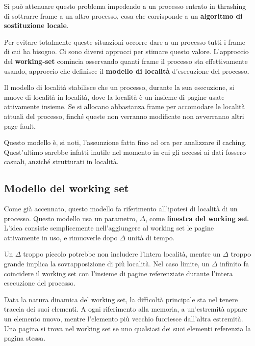         Si può attenuare questo problema impedendo a un processo entrato in thrashing di sottrarre frame a un altro processo, cosa che corrisponde a un \textbf{algoritmo di sostituzione locale}.
        
        Per evitare totalmente queste situazioni occorre dare a un processo tutti i frame di cui ha bisogno. Ci sono diversi approcci per stimare questo valore. L'approccio del \textbf{working-set} comincia osservando quanti frame il processo sta effettivamente usando, approccio che definisce il \textbf{modello di località} d'esecuzione del processo.
        
        Il modello di località stabilisce che un processo, durante la sua esecuzione, si muove di località in località, dove la località è un insieme di pagine usate attivamente insieme. Se si allocano abbastanza frame per accomodare le località attuali del processo, finché queste non verranno modificate non avverranno altri page fault.
        
        
        Questo modello è, si noti, l'assunzione fatta fino ad ora per analizzare il caching. Quest'ultimo sarebbe infatti inutile nel momento in cui gli accessi ai dati fossero casuali, anziché strutturati in località.
        
    \subsection{Modello del working set}
        Come già accennato, questo modello fa riferimento all'ipotesi di località di un processo. Questo modello usa un parametro, $\Delta$, come \textbf{finestra del working set}. L'idea consiste semplicemente nell'aggiungere al working set le pagine attivamente in uso, e rimuoverle dopo $\Delta$ unità di tempo.
        
        Un $\Delta$ troppo piccolo potrebbe non includere l'intera località, mentre un $\Delta$ troppo grande implica la sovrapposizione di più località. Nel caso limite, un $\Delta$ infinito fa coincidere il working set con l'insieme di pagine referenziate durante l'intera esecuzione del processo.
        
        Data la natura dinamica del working set, la difficoltà principale sta nel tenere traccia dei suoi elementi. A ogni riferimento alla memoria, a un'estremità appare un elemento nuovo, mentre l'elemento più vecchio fuoriesce dall'altra estremità. Una pagina si trova nel working set se uno qualsiasi dei suoi elementi referenzia la pagina stessa.
        
